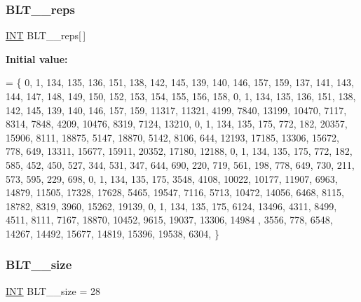 \mbox{\label{data___b_l_t_8_c_af2699e6604185ea0a5e1bffd74b0cdf4}} 
\subsubsection{\texorpdfstring{B\+L\+T\+\_\+\_\+reps}{BLT\_27\_reps}}
{\footnotesize\ttfamily \mbox{\hyperlink{galois_8h_a09fddde158a3a20bd2dcadb609de11dc}{I\+NT}} B\+L\+T\+\_\+\_\+reps\mbox{[}$\,$\mbox{]}}

{\bfseries Initial value\+:}
\begin{DoxyCode}
= \{
    0, 1, 134, 135, 136, 151, 138, 142, 145, 139, 140, 146, 157, 159, 137, 141, 143, 144, 147, 148, 149, 
      150, 152, 153, 154, 155, 156, 158, 
    0, 1, 134, 135, 136, 151, 138, 142, 145, 139, 140, 146, 157, 159, 11317, 11321, 4199, 7840, 13199, 
      10470, 7117, 8314, 7848, 4209, 10476, 8319, 7124, 13210, 
    0, 1, 134, 135, 175, 772, 182, 20357, 15906, 8111, 18875, 5147, 18870, 5142, 8106, 644, 12193, 17185, 
      13306, 15672, 778, 649, 13311, 15677, 15911, 20352, 17180, 12188, 
    0, 1, 134, 135, 175, 772, 182, 585, 452, 450, 527, 344, 531, 347, 644, 690, 220, 719, 561, 198, 778, 
      649, 730, 211, 573, 595, 229, 698, 
    0, 1, 134, 135, 175, 3548, 4108, 10022, 10177, 11907, 6963, 14879, 11505, 17328, 17628, 5465, 19547, 
      7116, 5713, 10472, 14056, 6468, 8115, 18782, 8319, 3960, 15262, 19139, 
    0, 1, 134, 135, 175, 6124, 13496, 4311, 8499, 4511, 8111, 7167, 18870, 10452, 9615, 19037, 13306, 14984
      , 3556, 778, 6548, 14267, 14492, 15677, 14819, 15396, 19538, 6304, 
\}
\end{DoxyCode}
\mbox{\label{data___b_l_t_8_c_a2246cbd40c50772473f3dc4bd309af74}} 
\subsubsection{\texorpdfstring{B\+L\+T\+\_\+\_\+size}{BLT\_27\_size}}
{\footnotesize\ttfamily \mbox{\hyperlink{galois_8h_a09fddde158a3a20bd2dcadb609de11dc}{I\+NT}} B\+L\+T\+\_\+\_\+size = 28}

